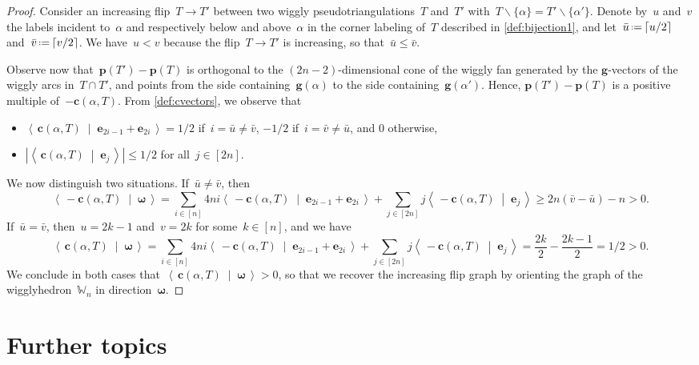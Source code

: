 \documentclass{amsart}
\theoremstyle{definition}
\renewcommand{\b}[1]{{\boldsymbol{#1}}} %
\newcommand{\ssm}{\smallsetminus} %
\newcommand{\dotprod}[2]{\left\langle \, #1 \; \middle| \; #2 \, \right\rangle} %
\newcommand{\eqdef}{\mbox{\,\raisebox{0.2ex}{\scriptsize\ensuremath{\mathrm:}}\ensuremath{=}\,}} %
\newcommand{\polytope}[1]{\mathds{#1}} %
\newcommand{\wigglyhedron}{\polytope{W}} %
\begin{document}
\begin{proof}
Consider an increasing flip~$T \to T'$ between two wiggly pseudotriangulations~$T$ and~$T'$ with~$T \ssm \{\alpha\} = T' \ssm \{\alpha'\}$.
Denote by~$u$ and~$v$ the labels incident to~$\alpha$ and respectively below and above~$\alpha$ in the corner labeling of~$T$ described in \cref{def:bijection1}, and let~$\bar u \eqdef \lceil u/2 \rceil$ and~$\bar v \eqdef \lceil v/2 \rceil$.
We have~$u < v$ because the flip~$T \to T'$ is increasing, so that~$\bar u \le \bar v$.

Observe now that~${\b{p}(T') - \b{p}(T)}$ is orthogonal to the $(2n-2)$-dimensional cone of the wiggly fan generated by the $\b{g}$-vectors of the wiggly arcs in~$T \cap T'$, and points from the side containing~$\b{g}(\alpha)$ to the side containing~$\b{g}(\alpha')$.
Hence, $\b{p}(T') - \b{p}(T)$ is a positive multiple of~$-\b{c}(\alpha, T)$.
From \cref{def:cvectors}, we observe that
\begin{itemize}
\item $\dotprod{\b{c}(\alpha, T)}{\b{e}_{2i-1} + \b{e}_{2i}} = 1/2$ if~$i = \bar u \ne \bar v$, $-1/2$ if~$i = \bar v \ne \bar u$, and $0$ otherwise,
\item $|\dotprod{\b{c}(\alpha, T)}{\b{e}_j}| \le 1/2$ for all~$j \in [2n]$.
\end{itemize}
We now distinguish two situations.
If~$\bar u \ne \bar v$, then
\[
\dotprod{-\b{c}(\alpha, T)}{\b{\omega}} = \sum_{i \in [n]} 4ni \dotprod{-\b{c}(\alpha, T)}{\b{e}_{2i-1} + \b{e}_{2i}} + \sum_{j \in [2n]} j \dotprod{-\b{c}(\alpha, T)}{\b{e}_j} \ge 2n(\bar v - \bar u) - n > 0.
\]
If~$\bar u = \bar v$, then~$u = 2k-1$ and~$v = 2k$ for some~$k \in [n]$, and we have
\[
\dotprod{\b{c}(\alpha, T)}{\b{\omega}} = \!\! \sum_{i \in [n]} 4ni \dotprod{-\b{c}(\alpha, T)}{\b{e}_{2i-1} + \b{e}_{2i}} + \!\! \sum_{j \in [2n]} j \dotprod{-\b{c}(\alpha, T)}{\b{e}_j} = \frac{2k}{2}-\frac{2k-1}{2} = 1/2 > 0.
\]
We conclude in both cases that~$\dotprod{\b{c}(\alpha, T)}{\b{\omega}} > 0$, so that we recover the increasing flip graph by orienting the graph of the wigglyhedron~$\wigglyhedron_n$ in direction~$\b{\omega}$.
\end{proof}


\section{Further topics}
\label{sec:furtherTopics}
\end{document}
